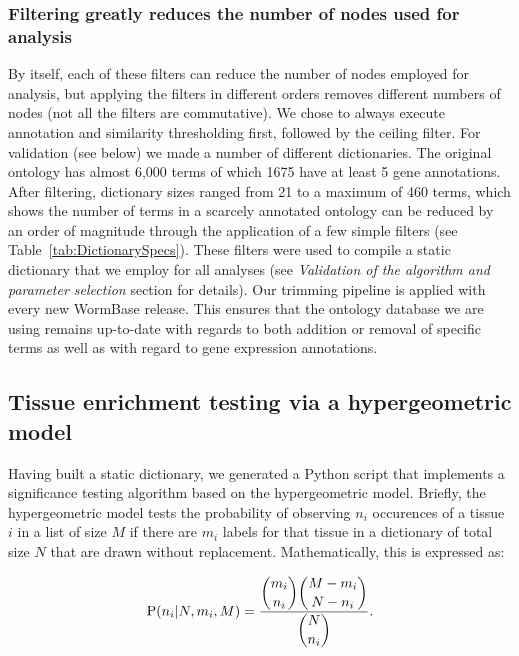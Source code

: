 \documentclass{bmcart}
\begin{document}
\subsubsection*{Filtering greatly reduces the number of nodes used for analysis}
By itself, each of these filters can reduce the number of nodes employed for analysis, but applying the filters in different orders removes different numbers of nodes (not all the filters are commutative). We chose to always execute annotation and similarity thresholding first, followed by the ceiling filter.
For validation (see below) we made a number of different dictionaries. The original ontology has almost 6,000 terms of which 1675 have at least 5 gene annotations. After filtering, dictionary sizes ranged from 21 to a maximum of 460 terms, which shows the number of terms in a scarcely annotated ontology can be reduced by an order of magnitude through the application of a few simple filters (see Table~\ref{tab:DictionarySpecs}). These filters were used to compile a static dictionary that we employ for all analyses (see \emph{Validation of the algorithm and parameter selection} section for details). Our trimming pipeline is applied with every new WormBase release. This ensures that the ontology database we are using remains up-to-date with regards to both addition or removal of specific terms as well as with regard to gene expression annotations. 


\subsection*{Tissue enrichment testing via a hypergeometric model}
Having built a static dictionary, we generated a Python script that implements a significance testing algorithm based on the hypergeometric model. Briefly, the hypergeometric model tests the probability of observing $n_i$ occurences of a tissue $i$ in a list of size $M$ if there are $m_i$ labels for that tissue in a dictionary of total size $N$ that are drawn without replacement. Mathematically, this is expressed as: 

\begin{eqnarray}\label{hypergeometric}
	\mathrm{P}(n_i | N, m_i, M) = \frac{\dbinom{m_i}{n_i} \dbinom{M-m_i}{N - n_i}}{\dbinom{N}{n_i}}\text{.}
\end{eqnarray}
\end{document}
